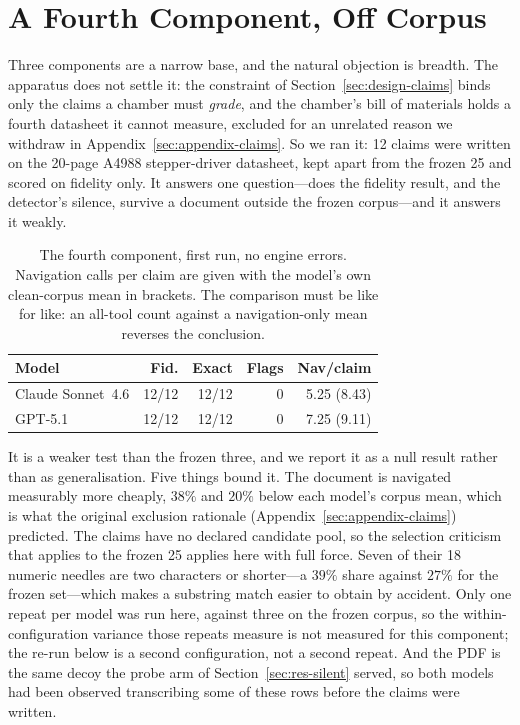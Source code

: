 \documentclass[11pt]{article}
\begin{document}
\section{A Fourth Component, Off Corpus}
\label{sec:appendix-fourth}

Three components are a narrow base, and the natural objection is
breadth. The apparatus does not settle it: the constraint of
Section~\ref{sec:design-claims} binds only the claims a chamber must
\emph{grade}, and the chamber's bill of materials holds a fourth
datasheet it cannot measure, excluded for an unrelated reason we
withdraw in Appendix~\ref{sec:appendix-claims}. So we ran it: 12
claims were written on the 20-page A4988 stepper-driver datasheet, kept
apart from the frozen 25 and scored on fidelity only. It answers one
question---does the fidelity result, and the detector's silence, survive
a document outside the frozen corpus---and it answers it weakly.

\begin{table}[ht]
\centering
\small
\begin{tabular}{@{}lrrrr@{}}
\toprule
\textbf{Model} & \textbf{Fid.} & \textbf{Exact} & \textbf{Flags} & \textbf{Nav/claim} \\
\midrule
Claude Sonnet~4.6 & 12/12 & 12/12 & 0 & 5.25 (8.43) \\
GPT-5.1           & 12/12 & 12/12 & 0 & 7.25 (9.11) \\
\bottomrule
\end{tabular}
\caption{The fourth component, first run, no engine errors.
Navigation calls per claim are given with the model's own clean-corpus
mean in brackets. The comparison must be like for like: an all-tool
count against a navigation-only mean reverses the conclusion.}
\label{tab:fourth}
\end{table}

It is a weaker test than the frozen three, and we report it as a null
result rather than as generalisation. Five things bound it. The document
is navigated measurably more cheaply, $38\%$ and $20\%$ below each
model's corpus mean, which is what the original exclusion rationale
(Appendix~\ref{sec:appendix-claims}) predicted. The claims have no
declared candidate pool, so the selection criticism that applies to the
frozen 25 applies here with full force. Seven of their 18 numeric
needles are two characters or shorter---a $39\%$ share against $27\%$
for the frozen set---which makes a substring match easier to obtain by
accident. Only
one repeat per model was run here, against three on the frozen corpus,
so the within-configuration variance those repeats measure is not
measured for this component; the re-run below is a second configuration,
not a second repeat. And the PDF
is the same decoy the probe arm of Section~\ref{sec:res-silent} served,
so both models had been observed transcribing some of these rows before
the claims were written.
\end{document}
